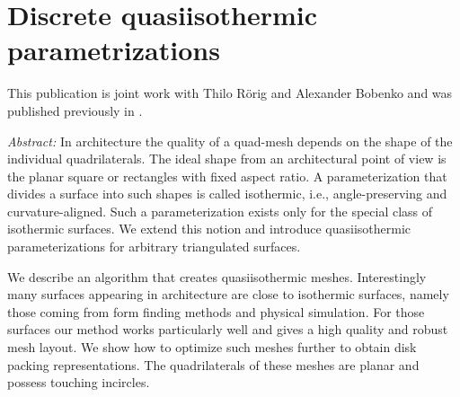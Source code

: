 \documentclass[Thesis.tex]{subfiles}
\begin{document}
\chapter{Discrete quasiisothermic parametrizations}
\label{chp:quasiisothermic}

This publication is joint work with Thilo R{\"o}rig and Alexander Bobenko and was published 
previously in \cite{Sechelmann2012}.

\emph{Abstract:} 
In architecture the quality of a quad-mesh depends on the shape of the individual
quadrilaterals. The ideal shape from an architectural point of view is the
planar square or rectangles with fixed aspect ratio. A parameterization that divides a
surface into such shapes is called isothermic, i.e., angle-preserving and
curvature-aligned. Such a parameterization exists only for the special class of
isothermic surfaces. We extend this notion and introduce quasiisothermic
parameterizations for arbitrary triangulated  surfaces.

We describe an algorithm that creates quasiisothermic meshes.
Interestingly many surfaces appearing in architecture are close to
isothermic surfaces, namely those coming from form finding methods and physical
simulation. For those surfaces our method works particularly well and gives a
high quality and robust mesh layout. We show how to optimize such meshes
further to obtain disk packing representations. The quadrilaterals of these
meshes are planar and possess touching incircles.
\end{document}
